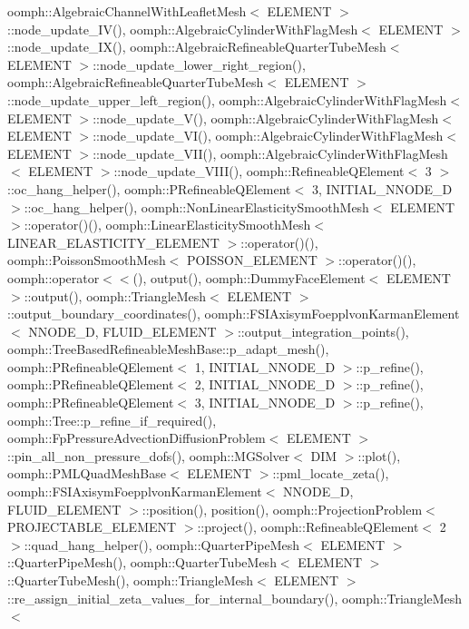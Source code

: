 oomph\+::\+Algebraic\+Channel\+With\+Leaflet\+Mesh$<$ E\+L\+E\+M\+E\+N\+T $>$\+::node\+\_\+update\+\_\+\+I\+V(), oomph\+::\+Algebraic\+Cylinder\+With\+Flag\+Mesh$<$ E\+L\+E\+M\+E\+N\+T $>$\+::node\+\_\+update\+\_\+\+I\+X(), oomph\+::\+Algebraic\+Refineable\+Quarter\+Tube\+Mesh$<$ E\+L\+E\+M\+E\+N\+T $>$\+::node\+\_\+update\+\_\+lower\+\_\+right\+\_\+region(), oomph\+::\+Algebraic\+Refineable\+Quarter\+Tube\+Mesh$<$ E\+L\+E\+M\+E\+N\+T $>$\+::node\+\_\+update\+\_\+upper\+\_\+left\+\_\+region(), oomph\+::\+Algebraic\+Cylinder\+With\+Flag\+Mesh$<$ E\+L\+E\+M\+E\+N\+T $>$\+::node\+\_\+update\+\_\+\+V(), oomph\+::\+Algebraic\+Cylinder\+With\+Flag\+Mesh$<$ E\+L\+E\+M\+E\+N\+T $>$\+::node\+\_\+update\+\_\+\+V\+I(), oomph\+::\+Algebraic\+Cylinder\+With\+Flag\+Mesh$<$ E\+L\+E\+M\+E\+N\+T $>$\+::node\+\_\+update\+\_\+\+V\+I\+I(), oomph\+::\+Algebraic\+Cylinder\+With\+Flag\+Mesh$<$ E\+L\+E\+M\+E\+N\+T $>$\+::node\+\_\+update\+\_\+\+V\+I\+I\+I(), oomph\+::\+Refineable\+Q\+Element$<$ 3 $>$\+::oc\+\_\+hang\+\_\+helper(), oomph\+::\+P\+Refineable\+Q\+Element$<$ 3, I\+N\+I\+T\+I\+A\+L\+\_\+\+N\+N\+O\+D\+E\+\_\+D $>$\+::oc\+\_\+hang\+\_\+helper(), oomph\+::\+Non\+Linear\+Elasticity\+Smooth\+Mesh$<$ E\+L\+E\+M\+E\+N\+T $>$\+::operator()(), oomph\+::\+Linear\+Elasticity\+Smooth\+Mesh$<$ L\+I\+N\+E\+A\+R\+\_\+\+E\+L\+A\+S\+T\+I\+C\+I\+T\+Y\+\_\+\+E\+L\+E\+M\+E\+N\+T $>$\+::operator()(), oomph\+::\+Poisson\+Smooth\+Mesh$<$ P\+O\+I\+S\+S\+O\+N\+\_\+\+E\+L\+E\+M\+E\+N\+T $>$\+::operator()(), oomph\+::operator$<$$<$(), output(), oomph\+::\+Dummy\+Face\+Element$<$ E\+L\+E\+M\+E\+N\+T $>$\+::output(), oomph\+::\+Triangle\+Mesh$<$ E\+L\+E\+M\+E\+N\+T $>$\+::output\+\_\+boundary\+\_\+coordinates(), oomph\+::\+F\+S\+I\+Axisym\+Foepplvon\+Karman\+Element$<$ N\+N\+O\+D\+E\+\_\+D, F\+L\+U\+I\+D\+\_\+\+E\+L\+E\+M\+E\+N\+T $>$\+::output\+\_\+integration\+\_\+points(), oomph\+::\+Tree\+Based\+Refineable\+Mesh\+Base\+::p\+\_\+adapt\+\_\+mesh(), oomph\+::\+P\+Refineable\+Q\+Element$<$ 1, I\+N\+I\+T\+I\+A\+L\+\_\+\+N\+N\+O\+D\+E\+\_\+D $>$\+::p\+\_\+refine(), oomph\+::\+P\+Refineable\+Q\+Element$<$ 2, I\+N\+I\+T\+I\+A\+L\+\_\+\+N\+N\+O\+D\+E\+\_\+D $>$\+::p\+\_\+refine(), oomph\+::\+P\+Refineable\+Q\+Element$<$ 3, I\+N\+I\+T\+I\+A\+L\+\_\+\+N\+N\+O\+D\+E\+\_\+D $>$\+::p\+\_\+refine(), oomph\+::\+Tree\+::p\+\_\+refine\+\_\+if\+\_\+required(), oomph\+::\+Fp\+Pressure\+Advection\+Diffusion\+Problem$<$ E\+L\+E\+M\+E\+N\+T $>$\+::pin\+\_\+all\+\_\+non\+\_\+pressure\+\_\+dofs(), oomph\+::\+M\+G\+Solver$<$ D\+I\+M $>$\+::plot(), oomph\+::\+P\+M\+L\+Quad\+Mesh\+Base$<$ E\+L\+E\+M\+E\+N\+T $>$\+::pml\+\_\+locate\+\_\+zeta(), oomph\+::\+F\+S\+I\+Axisym\+Foepplvon\+Karman\+Element$<$ N\+N\+O\+D\+E\+\_\+D, F\+L\+U\+I\+D\+\_\+\+E\+L\+E\+M\+E\+N\+T $>$\+::position(), position(), oomph\+::\+Projection\+Problem$<$ P\+R\+O\+J\+E\+C\+T\+A\+B\+L\+E\+\_\+\+E\+L\+E\+M\+E\+N\+T $>$\+::project(), oomph\+::\+Refineable\+Q\+Element$<$ 2 $>$\+::quad\+\_\+hang\+\_\+helper(), oomph\+::\+Quarter\+Pipe\+Mesh$<$ E\+L\+E\+M\+E\+N\+T $>$\+::\+Quarter\+Pipe\+Mesh(), oomph\+::\+Quarter\+Tube\+Mesh$<$ E\+L\+E\+M\+E\+N\+T $>$\+::\+Quarter\+Tube\+Mesh(), oomph\+::\+Triangle\+Mesh$<$ E\+L\+E\+M\+E\+N\+T $>$\+::re\+\_\+assign\+\_\+initial\+\_\+zeta\+\_\+values\+\_\+for\+\_\+internal\+\_\+boundary(), oomph\+::\+Triangle\+Mesh$<$ 